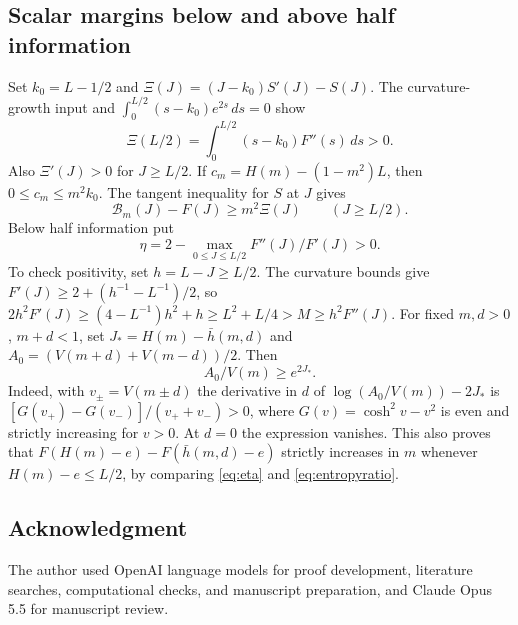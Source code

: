 \documentclass[11pt,reqno]{amsart}
\numberwithin{equation}{section}
\theoremstyle{definition}
\theoremstyle{remark}
\newcommand{\cB}{\mathcal B}
\begin{document}
\subsection{Scalar margins below and above half information}
Set $k_0=L-1/2$ and $\Xi(J)=(J-k_0)S'(J)-S(J)$.
The curvature-growth input and
$\int_0^{L/2}(s-k_0)e^{2s}\,ds=0$ show
\[
 \Xi(L/2)=\int_0^{L/2}(s-k_0)F''(s)\,ds>0.
\]
Also $\Xi'(J)>0$ for $J\ge L/2$.
If $c_m=H(m)-(1-m^2)L$, then $0\le c_m\le m^2k_0$.
The tangent inequality for $S$ at $J$ gives
\begin{equation}\label{eq:high}
 \cB_m(J)-F(J)\ge m^2\Xi(J)\qquad(J\ge L/2).
\end{equation}
Below half information put
\begin{equation}\label{eq:eta}
 \eta=2-\max_{0\le J\le L/2}F''(J)/F'(J)>0.
\end{equation}
To check positivity, set $h=L-J\ge L/2$. The curvature bounds give
$F'(J)\ge2+(h^{-1}-L^{-1})/2$, so
$2h^2F'(J)\ge(4-L^{-1})h^2+h\ge L^2+L/4>M\ge h^2F''(J)$.
For fixed $m,d>0$, $m+d<1$, set
$J_*=H(m)-\bar h(m,d)$ and
$A_0=(V(m+d)+V(m-d))/2$. Then
\begin{equation}\label{eq:entropyratio}
 A_0/V(m)\ge e^{2J_*}.
\end{equation}
Indeed, with $v_\pm=V(m\pm d)$ the derivative in $d$ of
$\log(A_0/V(m))-2J_*$ is
$[G(v_+)-G(v_-)]/(v_++v_-)>0$, where
$G(v)=\cosh^2v-v^2$ is even and strictly increasing for $v>0$.
At $d=0$ the expression vanishes. This also proves that
$F(H(m)-e)-F(\bar h(m,d)-e)$ strictly increases in $m$ whenever
$H(m)-e\le L/2$, by comparing \eqref{eq:eta} and
\eqref{eq:entropyratio}.






\subsection*{Acknowledgment}
The author used OpenAI language models for proof development, literature
searches, computational checks, and manuscript preparation, and Claude
Opus 5.5 for manuscript review.
\end{document}
